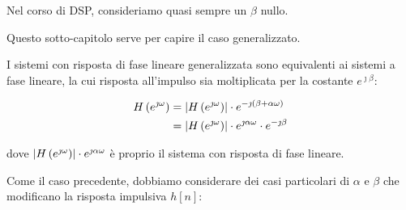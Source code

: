 \begin{tcolorbox}
    Nel corso di DSP, consideriamo quasi sempre un $\beta$ nullo. \newline 

    Questo sotto-capitolo serve per capire il caso generalizzato. 
\end{tcolorbox}

I sistemi con risposta di fase lineare generalizzata sono equivalenti ai sistemi a fase lineare, 
la cui risposta all'impulso sia moltiplicata per la costante $e^{\jmath \beta}$: 

{
    \Large 
    \begin{equation}
        \begin{split}
        H \left( e^{\jmath \omega}\right)
        &= 
        \abs{H \left(e^{\jmath \omega}\right)}
        \cdot 
        e^{- \jmath \left(\beta + \alpha \omega\right)} 
        \\
        &= 
        \abs{H \left(e^{\jmath \omega}\right)}
        \cdot 
        e^{\jmath \alpha \omega}
        \cdot 
        e^{- \jmath \beta } 
        \end{split}
    \end{equation}
}

dove $\abs{H \left(e^{\jmath \omega}\right)} \cdot e^{\jmath \alpha \omega} $ è proprio il sistema con risposta di fase lineare. \newline 

Come il caso precedente, 
dobbiamo considerare dei casi particolari di $\alpha$ e $\beta$ che modificano la risposta impulsiva $h \left[ n\right]$: 

